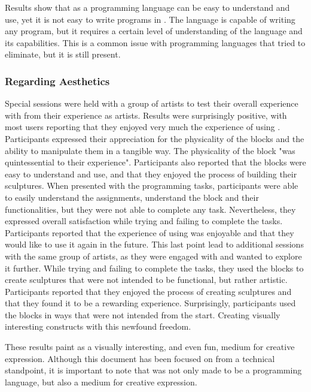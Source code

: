 Results show that \sculpt as a programming language can be easy to understand and use, yet it is not easy to write programs in \sculpt.
The language is capable of writing any program, but it requires a certain level of understanding of the language and its capabilities.
This is a common issue with programming languages that \sculpt tried to eliminate, but it is still present.

\subsubsection{Regarding Aesthetics}
\label{sec:results:validation:aesthetics}
Special sessions were held with a group of artists to test their overall experience with \sculpt from their experience as artists.
Results were surprisingly positive, with most users reporting that they enjoyed very much the experience of using \sculpt.
Participants expressed their appreciation for the physicality of the blocks and the ability to manipulate them in a tangible way.
The physicality of the block "was quintessential to their experience".
Participants also reported that the blocks were easy to understand and use, and that they enjoyed the process of building their sculptures.
When presented with the programming tasks, participants were able to easily understand the assignments, understand the block and their functionalities, but they were not able to complete any task.
Nevertheless, they expressed overall satisfaction while trying and failing to complete the tasks.
Participants reported that the experience of using \sculpt was enjoyable and that they would like to use it again in the future.
This last point lead to additional sessions with the same group of artists, as they were engaged with \sculpt and wanted to explore it further.
While trying and failing to complete the tasks, they used the blocks to create sculptures that were not intended to be functional, but rather artistic.
Participants reported that they enjoyed the process of creating sculptures and that they found it to be a rewarding experience.
Surprisingly, participants used the blocks in ways that were not intended from the start. Creating visually interesting constructs with this newfound freedom.

These results paint \sculpt as a visually interesting, and even fun, medium for creative expression.
Although this document has been focused on \sculpt from a technical standpoint, it is important to note that \sculpt was not only made to be a programming language, but also a medium for creative expression.
